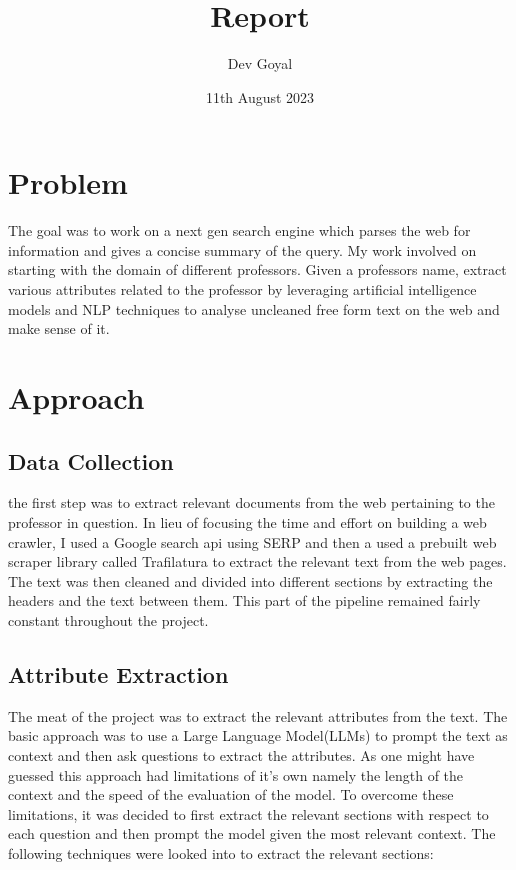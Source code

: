 \documentclass{article}
\title{Report}
\author{Dev Goyal}
\date{11th August 2023}
\begin{document}
\maketitle

\section{Problem}
The goal was to work on a next gen search engine which parses the web for information and gives a concise summary of the query. My work involved on starting with the domain of different professors. Given a professors name, extract various attributes related to the professor by leveraging artificial intelligence models and NLP techniques to analyse uncleaned free form text on the web and make sense of it.

\section{Approach}

\subsection{Data Collection}

the first step was to extract relevant documents from the web pertaining to the professor in question. In lieu of focusing the time and effort on building a web crawler, I used a Google search api using SERP and then a used a prebuilt web scraper library called Trafilatura to extract the relevant text from the web pages. The text was then cleaned and divided into different sections by extracting the headers and the text between them. This part of the pipeline remained fairly constant throughout the project.

\subsection{Attribute Extraction}
The meat of the project was to extract the relevant attributes from the text. The basic approach was to use a Large Language Model(LLMs) to prompt the text as context and then ask questions to extract the attributes. As one might have guessed this approach had limitations of it's own namely the length of the context and the speed of the evaluation of the model. To overcome these limitations, it was decided to first extract the relevant sections with respect to each question and then prompt the model given the most relevant context. The following techniques were looked into to extract the relevant sections:
\end{document}
